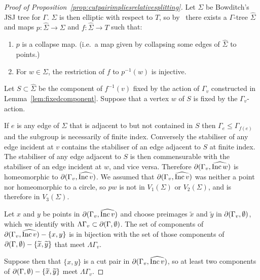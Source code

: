 \begin{proof}[Proof of Proposition~\ref{prop:cutpairimpliesrelativesplitting}]
Let $\Sigma$ be Bowditch's JSJ tree for $\Gamma$. $\Sigma$ is
then elliptic with respect to $T$, so by~\cite[Proposition
2.2]{guirardellevitt16} there exists a $\Gamma$-tree $\widehat\Sigma$ and maps $p
\colon \widehat\Sigma \to \Sigma$ and $f \colon \widehat\Sigma \to T$ such that:
\begin{enumerate}
  \item $p$ is a collapse map. (i.e.\ a map given by collapsing some edges of
    $\widehat\Sigma$ to points.)
  \item For $w \in \Sigma$, the restriction of $f$ to $p^{-1}(w)$ is injective.
\end{enumerate}

Let $S \subset \widehat\Sigma$ be the component of $f^{-1}(v)$ fixed by the action
of $\Gamma_v$ constructed in Lemma~\ref{lem:fixedcomponent}. Suppose that a
vertex $w$ of $S$ is fixed by the $\Gamma_v$-action.

If $e$ is any edge of $\widehat\Sigma$ that is adjacent to but not contained in $S$
then $\Gamma_e \leq \Gamma_{f(e)}$ and the subgroup is necessarily of finite
index. Conversely the stabiliser of any edge incident at $v$ contains the
stabiliser of an edge adjacent to $S$ at finite index. The stabiliser of any
edge adjacent to $S$ is then commensurable with the stabiliser of an edge
incident at $w$, and vice versa. Therefore $\partial(\Gamma_v, \widehat{\operatorname{\mathrm{Inc}} w})$ is
homeomorphic to $\partial(\Gamma_v, \widehat{\operatorname{\mathrm{Inc}} v})$. We assumed that
$\partial(\Gamma_v, \widehat{\operatorname{\mathrm{Inc}} v})$ was neither a point nor homeomorphic to a circle,
so $pw$ is not in $V_1(\Sigma)$ or $V_2(\Sigma)$, and is therefore in
$V_3(\Sigma)$.

Let $x$ and $y$ be points in $\partial(\Gamma_v, \widehat{\operatorname{\mathrm{Inc}} v})$ and choose preimages
$\widetilde{x}$ and $\widetilde{y}$ in $\partial(\Gamma_v, \emptyset)$, which
we identify with $\Lambda\Gamma_v \subset \partial(\Gamma, \emptyset)$.  
The set of components of $\partial(\Gamma_v, \widehat{\operatorname{\mathrm{Inc}} v}) - \{x, y\}$ is in
bijection with the set of those components of $\partial(\Gamma, \emptyset) -
\{\widetilde{x}, \widetilde{y}\}$ that meet $\Lambda\Gamma_v$. 

Suppose then
that $\{x, y\}$ is a cut pair in $\partial(\Gamma_v, \widehat{\operatorname{\mathrm{Inc}} v})$, so at least two
components of $\partial(\Gamma, \emptyset) - \{\widetilde{x}, \widetilde{y}\}$ meet
$\Lambda\Gamma_v$.


\end{proof}

